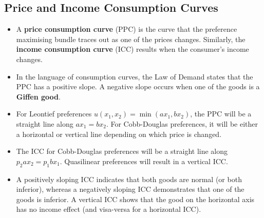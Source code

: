 \documentclass[a4paper]{article}
\begin{document}
\subsection{Price and Income Consumption Curves}
\begin{itemize}
    \item A \textbf{price consumption curve} (PPC) is the curve that the preference maximising bundle traces out as one of the prices changes. Similarly, the \textbf{income consumption curve} (ICC) results when the consumer's income changes.
    \item In the language of consumption curves, the Law of Demand states that the PPC has a positive slope. A negative slope occurs when one of the goods is a \textbf{Giffen good}.
    \item For Leontief preferences $u(x_1, x_2) = \min(ax_1, bx_2)$, the PPC will be a straight line along $ax_1 = bx_2$. For Cobb-Douglas preferences, it will be either a horizontal or vertical line depending on which price is changed.
    \item The ICC for Cobb-Douglas preferences will be a straight line along $p_2 a x_2 = p_1 b x_1$. Quasilinear preferences will result in a vertical ICC.
    \item A positively sloping ICC indicates that both goods are normal (or both inferior), whereas a negatively sloping ICC demonstrates that one of the goods is inferior. A vertical ICC shows that the good on the horizontal axis has no income effect (and visa-versa for a horizontal ICC).
\end{itemize}
\end{document}
